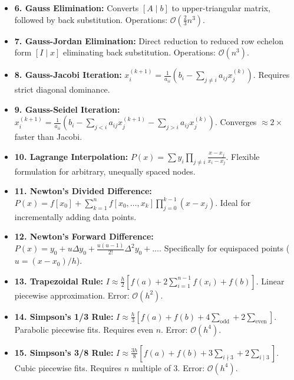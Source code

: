 \documentclass[10pt,a4paper]{report}
\begin{document}
\begin{tcolorbox}[colback=codebg,colframe=secondary,title=\textbf{Unit 2: Systems of Linear Algebraic Equations},boxrule=1.2pt,arc=2mm]
\begin{itemize}[leftmargin=*,itemsep=4pt]
\item \textbf{6. Gauss Elimination:} Converts $[A \mid b]$ to upper-triangular matrix, followed by back substitution. Operations: $\mathcal{O}(\frac{2}{3}n^3)$.
\item \textbf{7. Gauss-Jordan Elimination:} Direct reduction to reduced row echelon form $[I \mid x]$ eliminating back substitution. Operations: $\mathcal{O}(n^3)$.
\item \textbf{8. Gauss-Jacobi Iteration:} $x_i^{(k+1)} = \frac{1}{a_{ii}}(b_i - \sum_{j \neq i} a_{ij} x_j^{(k)})$. Requires strict diagonal dominance.
\item \textbf{9. Gauss-Seidel Iteration:} $x_i^{(k+1)} = \frac{1}{a_{ii}}(b_i - \sum_{j < i} a_{ij} x_j^{(k+1)} - \sum_{j > i} a_{ij} x_j^{(k)})$. Converges $\approx 2\times$ faster than Jacobi.
\end{itemize}
\end{tcolorbox}

\begin{tcolorbox}[colback=codebg,colframe=secondary,title=\textbf{Unit 3: Interpolation \& Polynomial Approximation},boxrule=1.2pt,arc=2mm]
\begin{itemize}[leftmargin=*,itemsep=4pt]
\item \textbf{10. Lagrange Interpolation:} $P(x) = \sum y_i \prod_{j \neq i} \frac{x - x_j}{x_i - x_j}$. Flexible formulation for arbitrary, unequally spaced nodes.
\item \textbf{11. Newton's Divided Difference:} $P(x) = f[x_0] + \sum_{k=1}^n f[x_0,\dots,x_k] \prod_{j=0}^{k-1} (x - x_j)$. Ideal for incrementally adding data points.
\item \textbf{12. Newton's Forward Difference:} $P(x) = y_0 + u \Delta y_0 + \frac{u(u-1)}{2!} \Delta^2 y_0 + \dots$. Specifically for equispaced points ($u = (x-x_0)/h$).
\end{itemize}
\end{tcolorbox}

\begin{tcolorbox}[colback=codebg,colframe=secondary,title=\textbf{Unit 4: Numerical Quadrature \& Integration},boxrule=1.2pt,arc=2mm]
\begin{itemize}[leftmargin=*,itemsep=4pt]
\item \textbf{13. Trapezoidal Rule:} $I \approx \frac{h}{2}[f(a) + 2\sum_{i=1}^{n-1} f(x_i) + f(b)]$. Linear piecewise approximation. Error: $\mathcal{O}(h^2)$.
\item \textbf{14. Simpson's 1/3 Rule:} $I \approx \frac{h}{3}[f(a) + f(b) + 4\sum_{\text{odd}} + 2\sum_{\text{even}}]$. Parabolic piecewise fits. Requires even $n$. Error: $\mathcal{O}(h^4)$.
\item \textbf{15. Simpson's 3/8 Rule:} $I \approx \frac{3h}{8}[f(a) + f(b) + 3\sum_{i \nmid 3} + 2\sum_{i \mid 3}]$. Cubic piecewise fits. Requires $n$ multiple of 3. Error: $\mathcal{O}(h^4)$.
\end{itemize}
\end{tcolorbox}
\end{document}
